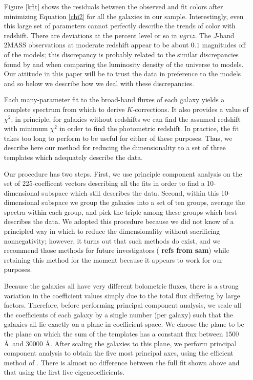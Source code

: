 \documentclass[10pt,preprint]{aastex}
\begin{document}
Figure \ref{kfit} shows the residuals between the observed and fit
colors after minimizing Equation \ref{chi2} for all the galaxies in
our sample. Interestingly, even this large set of parameters cannot
perfectly describe the trends of color with redshift. There are
deviations at the percent level or so in $ugriz$. The $J$-band 2MASS
observations at moderate redshift appear to be about $0.1$ magnitudes
off of the models; this discrepancy is probably related to the similar
discrepancies found by \citet{blanton03d} and \citet{baldry03a} when
comparing the luminosity density of the universe to models.  Our
attitude in this paper will be to trust the data in preference to the
models and so below we describe how we deal with these discrepancies.

Each many-parameter fit to the broad-band fluxes of each galaxy yields
a complete spectrum from which to derive $K$-corrections. It also
provides a value of $\chi^2$; in principle, for galaxies without
redshifts we can find the assumed redshift with minimum $\chi^2$ in
order to find the photometric redshift. In practice, the fit takes too
long to perform to be useful for either of these purposes. Thus, we
describe here our method for reducing the dimensionality to a set of
three templates which adequately describe the data.

Our procedure has two steps. First, we use principle component
analysis on the set of 225-coefficent vectors describing all the fits
in order to find a 10-dimensional subspace which still describes the
data. Second, within this 10-dimensional subspace we group the
galaxies into a set of ten groups, average the spectra within each
group, and pick the triple among these groups which best describes the
data. We adopted this procedure because we did not know of a
principled way in which to reduce the dimensionality without
sacrificing nonnegativity; however, it turns out that such methods do
exist, and we recommend those methods for future investigators ({\bf
refs from sam}) while retaining this method for the moment because it
appears to work for our purposes.

Because the galaxies all have very different bolometric fluxes, there
is a strong variation in the coefficient values simply due to the
total flux differing by large factors. Therefore, before performing
principal component analysis, we scale all the coefficients of each
galaxy by a single number (per galaxy) such that the galaxies all lie
exactly on a plane in coefficient space. We choose the plane to be the
plane on which the sum of the templates has a constant flux between
1500 \AA\ and 30000 \AA. After scaling the galaxies to this plane, we
perform principal component analysis to obtain the five most principal
axes, using the efficient method of \citet{roweis99a}. There is almost
no difference between the full fit shown above and that using the
first five eigencoefficients.
\end{document}
